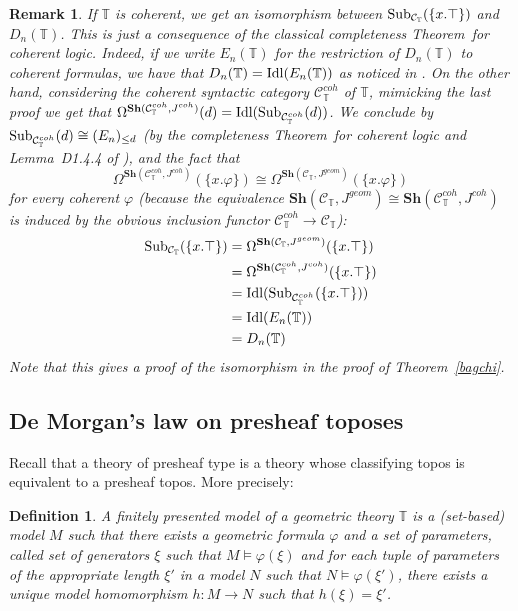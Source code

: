 \documentclass{article}
\newtheorem{definition}[theorem]{Definition}
\newtheorem{remark}[theorem]{Remark}
\newcommand{\T}{\mathbb{T}}
\renewcommand{\phi}{\varphi}
\begin{document}
\begin{remark}\label{completeness}
    If $\mathbb{T}$ is coherent, we get an isomorphism between $\textup{Sub}_{\mathcal{C}_\mathbb{T}}(\{x.\top\})$ and $D_n(\mathbb{T})$. This is just a consequence of the classical completeness Theorem~for coherent logic. Indeed, if we write $E_n(\mathbb{T})$ for the restriction of $D_n(\mathbb{T})$ to coherent formulas, we have that $D_n(\T)=\textup{\textup{Idl}}(E_n(\T))$ as noticed in \cite{bagchi1992morgan}. On the other hand, considering the coherent syntactic category $\mathcal{C}^{coh}_{\mathbb{T}}$ of $\mathbb{T}$, mimicking the last proof we get that $\Omega^{\mathbf{Sh}(\mathcal{C}^{coh}_\T,J^{coh})}(d)=\textup{Idl}(\textup{Sub}_{\mathcal{C}^{coh}_{\mathbb{T}}}(d))$. We conclude by $\textup{Sub}_{\mathcal{C}^{coh}_{\mathbb{T}}}(d)\cong (E_n)_{\leq d}$ (by the completeness Theorem~for coherent logic and Lemma~D1.4.4 of \cite{johnstone2002sketches}), and the fact that $$\Omega^{\mathbf{Sh}(\mathcal{C}^{coh}_\T,J^{coh})}(\{x.\phi\})\cong\Omega^{\mathbf{Sh}(\mathcal{C}_\T,J^{geom})}(\{x.\phi\})$$ for every coherent $\phi$ (because the equivalence $\mathbf{Sh}(\mathcal{C}_\T,J^{geom})\cong \mathbf{Sh}(\mathcal{C}_\T^{coh},J^{coh})$ is induced by the obvious inclusion functor $\mathcal{C}^{coh}_\T\xrightarrow{}\mathcal{C}_\T$):
    \begin{align*}
        \textup{Sub}_{\mathcal{C}_\mathbb{T}}(\{x.\top\}) & =\Omega^{\mathbf{Sh}(\mathcal{C}_\T,J^{geom})}(\{x.\top\})\\
        & =\Omega^{\mathbf{Sh}(\mathcal{C}^{coh}_\T,J^{coh})}(\{x.\top\})\\
        & =\textup{Idl}(\textup{Sub}_{\mathcal{C}^{coh}_{\mathbb{T}}}(\{x.\top\}))\\
        & =\textup{Idl}(E_n(\T))\\
        & =D_n(\T)
    \end{align*}
    Note that this gives a proof of the isomorphism in the proof of Theorem~\ref{bagchi}.
\end{remark}

\subsection{De Morgan's law on presheaf toposes}\label{sec:presheaf_type}
Recall that a theory of presheaf type is a theory whose classifying topos is equivalent to a presheaf topos. More precisely:

\begin{definition}
     A finitely presented model of a geometric theory $\T$ is a (set-based) model $M$ such that there exists a geometric formula $\phi$ and a set of parameters, called set of generators $\xi$ such that $M\models\phi(\xi)$ and for each tuple of parameters of the appropriate length $\xi'$ in a model $N$ such that $N\models\phi(\xi')$, there exists a unique model homomorphism $h:M\xrightarrow{}N$ such that $h(\xi)=\xi'$.
 \end{definition}
\end{document}
